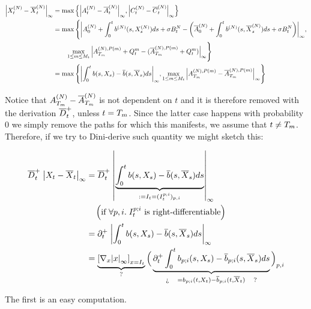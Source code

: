 \begin{align*}
	\normp{\infty}{\sol_t^{(N)}-\mfsol_t^{(N)}} 
	&= \max \left\{
	\normp{\infty}{\amba_t^{(N)} - \mfamba_t^{(N)}},
	\normp{\infty}{\camp_t^{(N)}  - \mfcamp_t^{(N)}}
	\right\}
	\\
	&= \max \Bigg\{
	\normp{\infty}{
		\amba_0^{(N)} 
		+ \int_0^t \drift^{(N)} (s, \sol_s^{(N)}) d s
		+ 
		\sigma B_t^N
	-
	\left(
		\mfamba_0^{(N)} 
		+ \int_0^t \drift^{(N)}(s, \mfsol_s^{(N)}) d s
		+ 
		\sigma B_t^N
	\right)
	},
	\\
	&\qquad
	\max_{1\leq m \leq \hmactive_t}
\normp{\infty}{
				\amba_{\btime_{m}}^{(N),\Parentof(m)}  + \quasibm_t^m
				-
				(\mfamba_{\btime_{m}}^{(N),\Parentof(m)}  + \quasibm_t^m)
		}
	\Bigg\}
	\\
	&=
	\max \Bigg\{
	\normp{\infty}{
		\int_0^t \drift(s, \sol_s) - \mfdrift(s, \mfsol_s) d s
	},	
	\max_{1\leq m \leq \hmactive_t}
	\normp{\infty}{
		\amba_{\btime_{m}}^{(N),\Parentof(m)} 
		-
		\mfamba_{\btime_{m}}^{(N),\Parentof(m)} 
	}
	\Bigg\}
\end{align*}

Notice that $\amba_{\btime_{m}}^{(N)} 
-
\mfamba_{\btime_{m}}^{(N)} $ is not dependent on $t$ and it is therefore removed with the derivation $\diniu^+_t$, unless $t = \btime_m$. Since the latter case happens with probability $0$ we simply remove the paths for which this manifests, \ie we assume that $t \neq \btime_m$.
Therefore, if we try to Dini-derive such quantity we might sketch this:

\begin{align*}
	\diniu^+_t 
	\;
	\normp{\infty}{\sol_t-\mfsol_t} 
	&=
		\diniu^+_t 
		\;
		\normp{\infty}{
			\underbrace{ \int_0^t \drift(s, \sol_s) - \mfdrift(s, \mfsol_s) d s}
				_{:= I_t = (I_t^{p;i})_{p,i}}
		}
	\\
	& \quad \left( \text{if $\forall p,i.\; I_t^{p;i}$ is right-differentiable} \right)
	\\
	& =
		\partial^+_t
		\;
		\normp{\infty}{
			\int_0^t \drift(s, \sol_s) - \mfdrift(s, \mfsol_s) d s
		}
	\\
	& =
		\underbrace{
			\left[ \nabla_x \normp{\infty}{x} \right]_{x = I_t}
		}_{?}
		\Big(
			\underbrace{
				\partial^+_t
				\int_0^t \drift_{p;i}(s, \sol_s) - \mfdrift_{p;i}(s, \mfsol_s) d s
			}_{\logQuest{ = \drift_{p;i}(t, \sol_t) - \mfdrift_{p;i}(t, \mfsol_t) }}
		\Big)_{p,i}
\end{align*}

The first is an easy computation.

